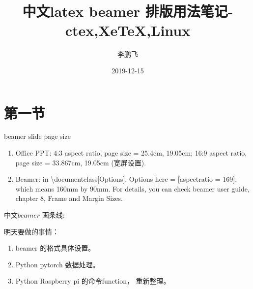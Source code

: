 \documentclass[UTF8,aspectratio = 169]{ctexbeamer}
\title{中文latex beamer 排版用法笔记-ctex,XeTeX,Linux}
\author{李鹏飞}
\date{2019-12-15}
\begin{document}
\section{第一节}
\begin{frame}{beamer slide page size}
\begin{enumerate}
\item Office PPT: 4:3 aspect ratio, page size = 25.4cm, 19.05cm; 16:9 aspect ratio, page size = 33.867cm, 19.05cm (宽屏设置).
\item Beamer: in \textbackslash documentclass[Options], Options here = [aspectratio = 169], which means 160mm by 90mm. For details, you can check beamer user guide, chapter 8, Frame and Margin Sizes.
\end{enumerate}
\end{frame}


\begin{frame}{中文$beamer$}
画条线:\\

明天要做的事情：

\begin{enumerate}
\item beamer 的格式具体设置。
\item Python pytorch 数据处理。
\item Python Raspberry pi 的命令function， 重新整理。
\end{enumerate}

\end{frame}
\end{document}
